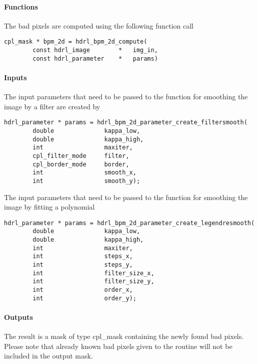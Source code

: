 \paragraph{Functions}

The bad pixels are computed using the following function call

\begin{lstlisting}
cpl_mask * bpm_2d = hdrl_bpm_2d_compute(
        const hdrl_image        *   img_in,
        const hdrl_parameter    *   params)
\end{lstlisting}
                                                                      
\paragraph{Inputs}

The input parameters that need to be passed to the function for
smoothing the image by a filter are created by
\begin{lstlisting}
hdrl_parameter * params = hdrl_bpm_2d_parameter_create_filtersmooth(
        double              kappa_low,
        double              kappa_high,
        int                 maxiter,
        cpl_filter_mode     filter,
        cpl_border_mode     border,
        int                 smooth_x,
        int                 smooth_y);
\end{lstlisting}

The input parameters that need to be passed to the function for
smoothing the image by  fitting a polynomial 

\begin{lstlisting}
hdrl_parameter * params = hdrl_bpm_2d_parameter_create_legendresmooth(
        double              kappa_low,
        double              kappa_high,
        int                 maxiter,
        int                 steps_x,
        int                 steps_y,
        int                 filter_size_x,
        int                 filter_size_y,
        int                 order_x,
        int                 order_y);
\end{lstlisting}

\paragraph{Outputs}

The result is a mask of type cpl\_mask containing the newly found bad
pixels. Please note that already known bad pixels given to the routine
will not be included in the output mask.


